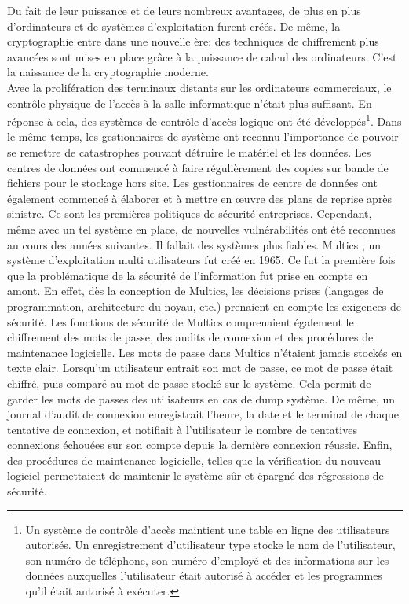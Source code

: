 Du fait de leur puissance et de leurs nombreux avantages, de plus en plus d’ordinateurs et de systèmes d’exploitation furent créés. De même, la cryptographie entre dans une nouvelle ère: des techniques de chiffrement plus avancées sont mises en place grâce à la puissance de calcul des ordinateurs. C’est la naissance de la cryptographie moderne.\\
Avec la prolifération des terminaux distants sur les ordinateurs commerciaux, le contrôle physique de l'accès à la salle informatique n'était plus suffisant. En réponse à cela, des systèmes de contrôle d'accès logique ont été développés\footnote{Un système de contrôle d'accès maintient une table en ligne des utilisateurs autorisés. Un enregistrement d'utilisateur type stocke le nom de l'utilisateur, son numéro de téléphone, son numéro d'employé et des informations sur les données auxquelles l'utilisateur était autorisé à accéder et les programmes qu'il était autorisé à exécuter.}. Dans le même temps, les gestionnaires de système ont reconnu l'importance de pouvoir se remettre de catastrophes pouvant détruire le matériel et les données. Les centres de données ont commencé à faire régulièrement des copies sur bande de fichiers pour le stockage hors site. Les gestionnaires de centre de données ont également commencé à élaborer et à mettre en œuvre des plans de reprise après sinistre. Ce sont les premières politiques de sécurité entreprises. Cependant, même avec un tel système en place, de nouvelles vulnérabilités ont été reconnues au cours des années suivantes. Il fallait des systèmes plus fiables. 
Multics \cite{multics} , un système d’exploitation multi utilisateurs fut créé en 1965. Ce fut la première fois que la problématique de la sécurité de l’information fut prise en compte en amont. En effet, dès la conception de Multics, les décisions prises (langages de programmation, architecture du noyau, etc.) prenaient en compte les exigences de sécurité. Les fonctions de sécurité de Multics comprenaient également le chiffrement des mots de passe, des audits de connexion et des procédures de maintenance logicielle. Les mots de passe dans Multics n’étaient jamais stockés en texte clair. Lorsqu'un utilisateur entrait son mot de passe, ce mot de passe était chiffré, puis comparé au mot de passe stocké sur le système. Cela permit de garder les mots de passes des utilisateurs en cas de dump système. De même, un journal d'audit de connexion enregistrait l'heure, la date et le terminal de chaque tentative de connexion, et notifiait à l'utilisateur le nombre de tentatives connexions échouées sur son compte depuis la dernière connexion réussie. Enfin, des procédures de maintenance logicielle, telles que la vérification du nouveau logiciel permettaient de maintenir le système sûr et épargné des régressions de sécurité. 
